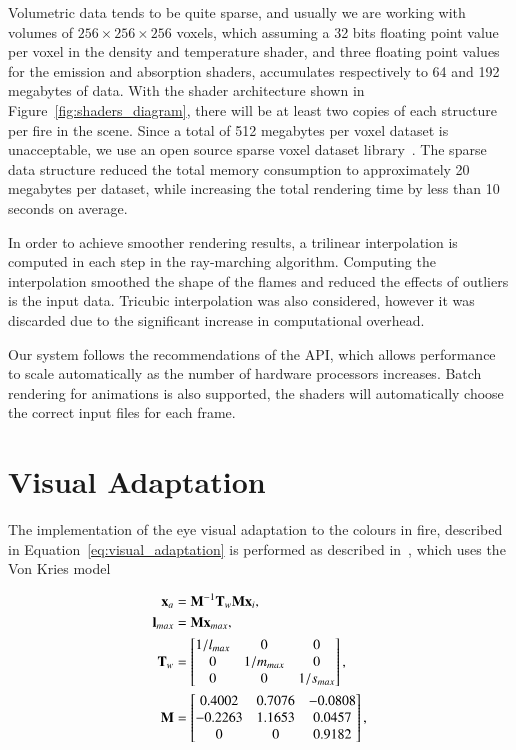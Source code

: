 Volumetric data tends to be quite sparse, and usually we are working with volumes of $256 \times 256 \times 256$ voxels, which assuming a 32 bits floating point value per voxel in the density and temperature shader, and three floating point values for the emission and absorption shaders, accumulates respectively to 64 and 192 megabytes of data.
With the shader architecture shown in Figure~\ref{fig:shaders_diagram}, there will be at least two copies of each structure per fire in the scene.
Since a total of 512 megabytes per voxel dataset is unacceptable, we use an open source sparse voxel dataset library~\cite{OpenVDB}.
The sparse data structure reduced the total memory consumption to approximately 20 megabytes per dataset, while increasing the total rendering time by less than 10 seconds on average.

In order to achieve smoother rendering results, a trilinear interpolation is computed in each step in the ray-marching algorithm.
Computing the interpolation smoothed the shape of the flames and reduced the effects of outliers is the input data.
Tricubic interpolation was also considered, however it was discarded due to the significant increase in computational overhead.

Our system follows the recommendations of the \MentalRay API, which allows performance to scale automatically as the number of hardware processors increases.
Batch rendering for animations is also supported, the shaders will automatically choose the correct input files for each frame. 

\section{Visual Adaptation}
\label{sec:visual_adaptation_imp}

The implementation of the eye visual adaptation to the colours in fire, described in Equation~\ref{eq:visual_adaptation} is performed as described in~\cite{Nguyen:2002}, which uses the Von Kries model~\cite{Fairchild:2005} 

\begin{equation}
\begin{split}
\mathbf{x}_a &= \mathbf{M}^{-1} \mathbf{T}_w \mathbf{M} \mathbf{x}_i, \\
\mathbf{l}_{max} &= \mathbf{M} \mathbf{x}_{max}, \\
\mathbf{T}_w &= 
\begin{bmatrix}
1 / l_{max} & 0 & 0\\
0 & 1 / m_{max} & 0\\
0 & 0 & 1 / s_{max}\\
\end{bmatrix}, \\
\mathbf{M} &= 
\begin{bmatrix}
0.4002 & 0.7076 & -0.0808\\
-0.2263 & 1.1653 & 0.0457\\
0 & 0 & 0.9182\\
\end{bmatrix},
\end{split}
\end{equation}

